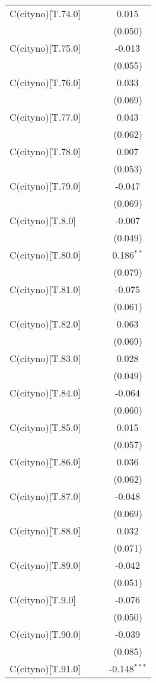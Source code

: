 \begin{table}[!htbp]
\begin{tabular}{@{\extracolsep{5pt}}lccc}
 C(cityno)[T.74.0] & & & 0.015$^{}$ \\
& & & (0.050) \\
 C(cityno)[T.75.0] & & & -0.013$^{}$ \\
& & & (0.055) \\
 C(cityno)[T.76.0] & & & 0.033$^{}$ \\
& & & (0.069) \\
 C(cityno)[T.77.0] & & & 0.043$^{}$ \\
& & & (0.062) \\
 C(cityno)[T.78.0] & & & 0.007$^{}$ \\
& & & (0.053) \\
 C(cityno)[T.79.0] & & & -0.047$^{}$ \\
& & & (0.069) \\
 C(cityno)[T.8.0] & & & -0.007$^{}$ \\
& & & (0.049) \\
 C(cityno)[T.80.0] & & & 0.186$^{**}$ \\
& & & (0.079) \\
 C(cityno)[T.81.0] & & & -0.075$^{}$ \\
& & & (0.061) \\
 C(cityno)[T.82.0] & & & 0.063$^{}$ \\
& & & (0.069) \\
 C(cityno)[T.83.0] & & & 0.028$^{}$ \\
& & & (0.049) \\
 C(cityno)[T.84.0] & & & -0.064$^{}$ \\
& & & (0.060) \\
 C(cityno)[T.85.0] & & & 0.015$^{}$ \\
& & & (0.057) \\
 C(cityno)[T.86.0] & & & 0.036$^{}$ \\
& & & (0.062) \\
 C(cityno)[T.87.0] & & & -0.048$^{}$ \\
& & & (0.069) \\
 C(cityno)[T.88.0] & & & 0.032$^{}$ \\
& & & (0.071) \\
 C(cityno)[T.89.0] & & & -0.042$^{}$ \\
& & & (0.051) \\
 C(cityno)[T.9.0] & & & -0.076$^{}$ \\
& & & (0.050) \\
 C(cityno)[T.90.0] & & & -0.039$^{}$ \\
& & & (0.085) \\
 C(cityno)[T.91.0] & & & -0.148$^{***}$ \\

\end{tabular}
\end{table}

